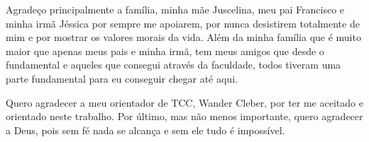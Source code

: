 \begin{agradecimentos}
    Agradeço principalmente a família, minha mãe Juscelina, meu pai Francisco e minha irmã Jéssica por sempre me apoiarem, por nunca desistirem totalmente de mim e por mostrar os valores morais da vida. Além da minha família que é muito maior que apenas meus pais e minha irmã, tem meus amigos que desde o fundamental e aqueles que consegui através da faculdade, todos tiveram uma parte fundamental para eu conseguir chegar até aqui.
    
    Quero agradecer a meu orientador de TCC, Wander Cleber, por ter me aceitado e orientado neste trabalho. Por último, mas não menos importante, quero agradecer a Deus, pois sem fé nada se alcança e sem ele tudo é impossível.
\end{agradecimentos}
